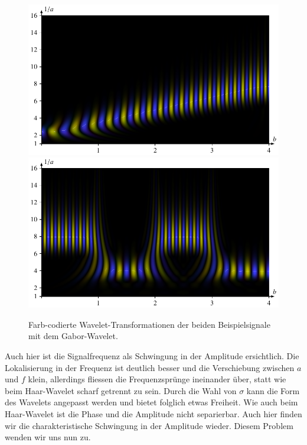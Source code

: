 \begin{figure}
	\centering
	\includegraphics{papers/complex/images/chirp_gabor.pdf}
	\includegraphics{papers/complex/images/square_gabor.pdf}
	\caption{Farb-codierte Wavelet-Transformationen  der beiden Beispielsignale mit dem Gabor-Wavelet.}
	\label{complex:gabor-ex}
\end{figure}

Auch hier ist die Signalfrequenz als Schwingung in der Amplitude ersichtlich. 
Die Lokalisierung in der Frequenz ist deutlich besser und die Verschiebung zwischen $a$ und $f$ klein, allerdings fliessen die Frequenzsprünge ineinander über, statt wie beim Haar-Wavelet scharf getrennt zu sein.
Durch die Wahl von $\sigma$ kann die Form des Wavelets angepasst werden und bietet folglich etwas Freiheit.
Wie auch beim Haar-Wavelet ist die Phase und die Amplitude nicht separierbar.
Auch hier finden wir die charakteristische Schwingung in der Amplitude wieder.
Diesem Problem wenden wir uns nun zu.